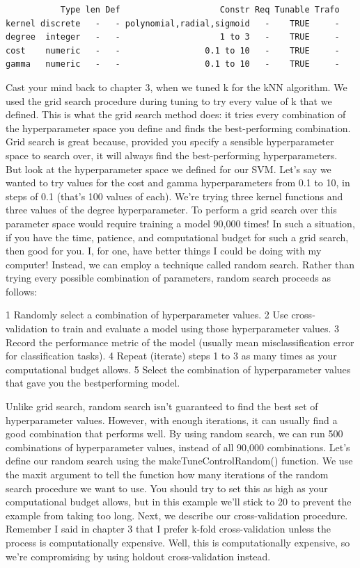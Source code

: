\documentclass[
]{article}
\begin{document}
\begin{verbatim}
           Type len Def                    Constr Req Tunable Trafo
kernel discrete   -   - polynomial,radial,sigmoid   -    TRUE     -
degree  integer   -   -                    1 to 3   -    TRUE     -
cost    numeric   -   -                 0.1 to 10   -    TRUE     -
gamma   numeric   -   -                 0.1 to 10   -    TRUE     -
\end{verbatim}

Cast your mind back to chapter 3, when we tuned k for the kNN algorithm.
We used the grid search procedure during tuning to try every value of k
that we defined. This is what the grid search method does: it tries
every combination of the hyperparameter space you define and finds the
best-performing combination. Grid search is great because, provided you
specify a sensible hyperparameter space to search over, it will always
find the best-performing hyperparameters. But look at the hyperparameter
space we defined for our SVM. Let's say we wanted to try values for the
cost and gamma hyperparameters from 0.1 to 10, in steps of 0.1 (that's
100 values of each). We're trying three kernel functions and three
values of the degree hyperparameter. To perform a grid search over this
parameter space would require training a model 90,000 times! In such a
situation, if you have the time, patience, and computational budget for
such a grid search, then good for you. I, for one, have better things I
could be doing with my computer! Instead, we can employ a technique
called random search. Rather than trying every possible combination of
parameters, random search proceeds as follows:

1 Randomly select a combination of hyperparameter values. 2 Use
cross-validation to train and evaluate a model using those
hyperparameter values. 3 Record the performance metric of the model
(usually mean misclassification error for classification tasks). 4
Repeat (iterate) steps 1 to 3 as many times as your computational budget
allows. 5 Select the combination of hyperparameter values that gave you
the bestperforming model.

Unlike grid search, random search isn't guaranteed to find the best set
of hyperparameter values. However, with enough iterations, it can
usually find a good combination that performs well. By using random
search, we can run 500 combinations of hyperparameter values, instead of
all 90,000 combinations. Let's define our random search using the
makeTuneControlRandom() function. We use the maxit argument to tell the
function how many iterations of the random search procedure we want to
use. You should try to set this as high as your computational budget
allows, but in this example we'll stick to 20 to prevent the example
from taking too long. Next, we describe our cross-validation procedure.
Remember I said in chapter 3 that I prefer k-fold cross-validation
unless the process is computationally expensive. Well, this is
computationally expensive, so we're compromising by using holdout
cross-validation instead.
\end{document}
